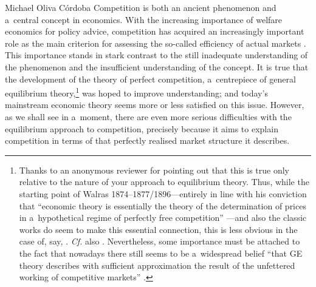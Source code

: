 \begin{artengenv}{Michael Oliva Córdoba}
Competition is both an ancient phenomenon and a~central concept in economics. With the increasing importance of welfare economics for policy advice, competition has acquired an increasingly important role as the main criterion for assessing the so-called efficiency of actual markets 
\parencites[e.g.,][]{motta_competition_2004}[][p.31ff.]{armentano_myths_1972}. %
 This importance stands in stark contrast to the still inadequate understanding of the phenomenon and the insufficient understanding of the concept. It is true that the development of the theory of perfect competition, a~centrepiece of general equilibrium theory,\footnote{Thanks to an anonymous reviewer for pointing out that this is true only relative to the nature of your approach to equilibrium theory. Thus, while the starting point of Walras 1874–1877/1896---entirely in line with his conviction that ``economic theory is essentially the theory of the determination of prices in a~hypothetical regime of perfectly free competition'' 
\parencite[][]{walras_lewalras_2019}%
---and also the classic works 
\parencites[][]{edgeworth_mathematical_1881}[][]{marshall_principles_1890}[][]{arrow_existence_1954}[][]{mckenzie_equilibrium_1954} %
 do seem to make this essential connection, this is less obvious in the case of, say, 
\parencites[][]{wald_uber_1935}[][]{samuelson_foundations_1947}[][]{mas-colell_equilibrium_1974}. %
 \textit{Cf.} also 
\parencites[][]{mckenzie_classical_1981}[][]{weintraub_retrospectives_2011}. %
 Nevertheless, some importance must be attached to the fact that nowadays there still seems to be a~widespread belief ``that GE theory describes with sufficient approximation the result of the unfettered working of competitive markets'' 
\parencite[][p.8]{petri_general_2003}.%
} was hoped to improve understanding; and today's mainstream economic theory seems more or less satisfied on this issue. However, as we shall see in a~moment, there are even more serious difficulties with the equilibrium approach to competition, precisely because it aims to explain competition in terms of that perfectly realised market structure it describes.




\end{artengenv}

